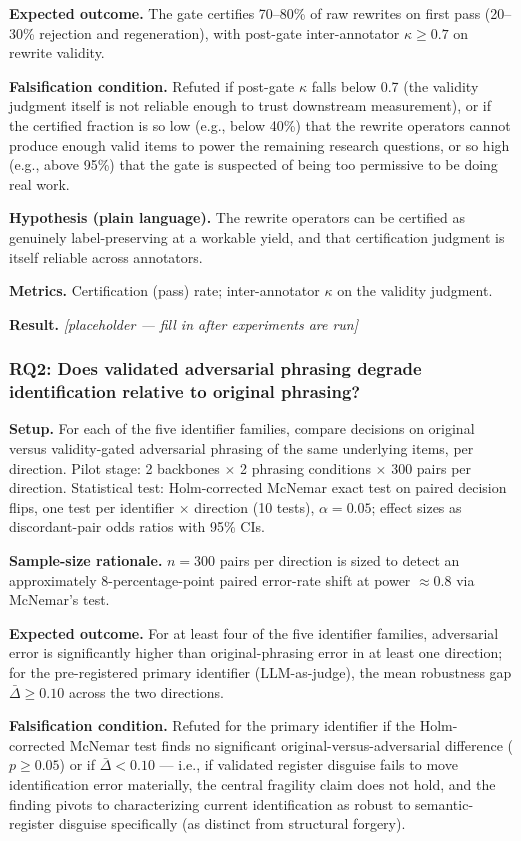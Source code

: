 \documentclass[11pt]{article}
\newcommand{\ph}{\textit{[placeholder --- fill in after experiments are run]}}
\begin{document}
\textbf{Expected outcome.} The gate certifies 70--80\% of raw rewrites on first pass (20--30\% rejection and regeneration), with post-gate inter-annotator $\kappa \geq 0.7$ on rewrite validity.

\textbf{Falsification condition.} Refuted if post-gate $\kappa$ falls below 0.7 (the validity judgment itself is not reliable enough to trust downstream measurement), or if the certified fraction is so low (e.g., below 40\%) that the rewrite operators cannot produce enough valid items to power the remaining research questions, or so high (e.g., above 95\%) that the gate is suspected of being too permissive to be doing real work.

\textbf{Hypothesis (plain language).} The rewrite operators can be certified as genuinely label-preserving at a workable yield, and that certification judgment is itself reliable across annotators.

\textbf{Metrics.} Certification (pass) rate; inter-annotator $\kappa$ on the validity judgment.

\textbf{Result.} \ph

\subsubsection{RQ2: Does validated adversarial phrasing degrade identification relative to original phrasing?}
\textbf{Setup.} For each of the five identifier families, compare decisions on original versus validity-gated adversarial phrasing of the same underlying items, per direction. Pilot stage: 2 backbones $\times$ 2 phrasing conditions $\times$ 300 pairs per direction. Statistical test: Holm-corrected McNemar exact test on paired decision flips, one test per identifier $\times$ direction (10 tests), $\alpha = 0.05$; effect sizes as discordant-pair odds ratios with 95\% CIs.

\textbf{Sample-size rationale.} $n = 300$ pairs per direction is sized to detect an approximately 8-percentage-point paired error-rate shift at power $\approx 0.8$ via McNemar's test.

\textbf{Expected outcome.} For at least four of the five identifier families, adversarial error is significantly higher than original-phrasing error in at least one direction; for the pre-registered primary identifier (LLM-as-judge), the mean robustness gap $\bar\Delta \geq 0.10$ across the two directions.

\textbf{Falsification condition.} Refuted for the primary identifier if the Holm-corrected McNemar test finds no significant original-versus-adversarial difference ($p \geq 0.05$) or if $\bar\Delta < 0.10$ --- i.e., if validated register disguise fails to move identification error materially, the central fragility claim does not hold, and the finding pivots to characterizing current identification as robust to semantic-register disguise specifically (as distinct from structural forgery).
\end{document}
